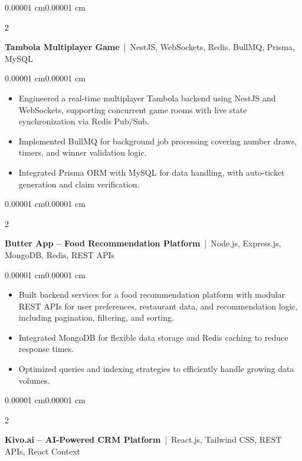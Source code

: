 \documentclass[10pt, letterpaper]{article}
\newenvironment{highlights}{
    \begin{itemize}[
        topsep=0.10 cm,
        parsep=0.10 cm,
        partopsep=0pt,
        itemsep=0.02 cm,
        leftmargin=15pt
    ]
}{
    \end{itemize}
}
\newenvironment{onecolentry}{
    \begin{adjustwidth}{0.00001 cm}{0.00001 cm}
}{
    \end{adjustwidth}
}
\newenvironment{twocolentry}[2][]{
    \onecolentry
    \def\secondColumn{#2}
    \setcolumnwidth{\fill, 4.5 cm}
    \begin{paracol}{2}
}{
    \switchcolumn \raggedleft \secondColumn
    \end{paracol}
    \endonecolentry
}
\begin{document}
\begin{twocolentry}{}
\textbf{Tambola Multiplayer Game} \,|\, NestJS, WebSockets, Redis, BullMQ, Prisma, MySQL
\end{twocolentry}

\vspace{0.10cm}

\begin{onecolentry}
\begin{highlights}
\item Engineered a real-time multiplayer Tambola backend using NestJS and WebSockets, supporting concurrent game rooms with live state synchronization via Redis Pub/Sub.
\item Implemented BullMQ for background job processing covering number draws, timers, and winner validation logic.
\item Integrated Prisma ORM with MySQL for data handling, with auto-ticket generation and claim verification.
\end{highlights}
\end{onecolentry}

\vspace{0.10cm}

\begin{twocolentry}{}
\textbf{Butter App -- Food Recommendation Platform} \,|\, Node.js, Express.js, MongoDB, Redis, REST APIs
\end{twocolentry}

\vspace{0.10cm}

\begin{onecolentry}
\begin{highlights}
\item Built backend services for a food recommendation platform with modular REST APIs for user preferences, restaurant data, and recommendation logic, including pagination, filtering, and sorting.
\item Integrated MongoDB for flexible data storage and Redis caching to reduce response times.
\item Optimized queries and indexing strategies to efficiently handle growing data volumes.
\end{highlights}
\end{onecolentry}

\vspace{0.10cm}

\begin{twocolentry}{}
\textbf{Kivo.ai -- AI-Powered CRM Platform} \,|\, React.js, Tailwind CSS, REST APIs, React Context
\end{twocolentry}
\end{document}
